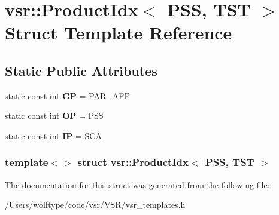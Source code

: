 \hypertarget{structvsr_1_1_product_idx_3_01_p_s_s_00_01_t_s_t_01_4}{\section{vsr\-:\-:Product\-Idx$<$ P\-S\-S, T\-S\-T $>$ Struct Template Reference}
\label{structvsr_1_1_product_idx_3_01_p_s_s_00_01_t_s_t_01_4}
}
\subsection*{Static Public Attributes}
\begin{DoxyCompactItemize}
\item 
\hypertarget{structvsr_1_1_product_idx_3_01_p_s_s_00_01_t_s_t_01_4_a71fbbae53c9d7a6c326bd1fefa3d5a68}{static const int {\bfseries G\-P} = P\-A\-R\-\_\-\-A\-F\-P}\label{structvsr_1_1_product_idx_3_01_p_s_s_00_01_t_s_t_01_4_a71fbbae53c9d7a6c326bd1fefa3d5a68}

\item 
\hypertarget{structvsr_1_1_product_idx_3_01_p_s_s_00_01_t_s_t_01_4_ab5a795d3861af36e17d6fc7ba9c7f1a2}{static const int {\bfseries O\-P} = P\-S\-S}\label{structvsr_1_1_product_idx_3_01_p_s_s_00_01_t_s_t_01_4_ab5a795d3861af36e17d6fc7ba9c7f1a2}

\item 
\hypertarget{structvsr_1_1_product_idx_3_01_p_s_s_00_01_t_s_t_01_4_a19a225c54e0b5a74f0157938026f21b1}{static const int {\bfseries I\-P} = S\-C\-A}\label{structvsr_1_1_product_idx_3_01_p_s_s_00_01_t_s_t_01_4_a19a225c54e0b5a74f0157938026f21b1}

\end{DoxyCompactItemize}
\subsubsection*{template$<$$>$ struct vsr\-::\-Product\-Idx$<$ P\-S\-S, T\-S\-T $>$}



The documentation for this struct was generated from the following file\-:\begin{DoxyCompactItemize}
\item 
/\-Users/wolftype/code/vsr/\-V\-S\-R/vsr\-\_\-templates.\-h\end{DoxyCompactItemize}
